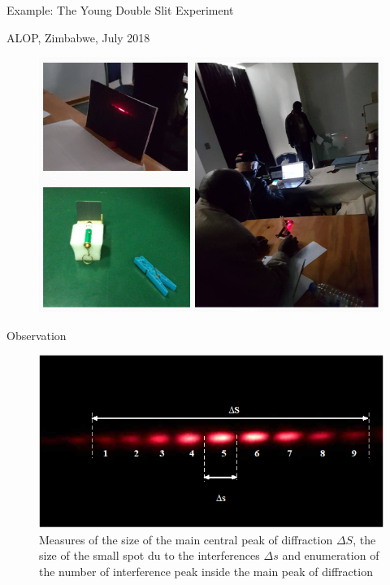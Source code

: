 \documentclass[serif ,mathserif, 8pt]{beamer}
\begin{document}
\begin{frame}{Example: The Young Double Slit Experiment}
	\begin{block}{ALOP, Zimbabwe, July 2018}
		\centering
		\begin{figure}
			\includegraphics[width=.7\linewidth]{images/alop2018}
		\end{figure}
	\end{block}
\end{frame}
\begin{frame}{Observation}
	\centering
	\begin{figure}
		\includegraphics[width=.9\linewidth]{images/Image1}
		\caption{Measures of the size of the main central peak of diffraction $\Delta S$, the size of the small spot du to the interferences $\Delta s$ and enumeration of the number of interference peak inside the main peak of diffraction
		}
	\end{figure}

\end{frame}
\end{document}
